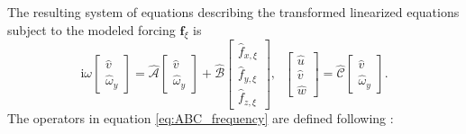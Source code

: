 The resulting system of equations describing the transformed linearized equations subject to the modeled forcing $\boldsymbol{f}_\xi$ is 
\begin{subequations}
\label{eq:ABC_frequency}
\begin{equation}
    \text{i}\omega\begin{bmatrix}
    \widehat{v}\\
    \widehat{\omega}_y
    \end{bmatrix}=\widehat{\mathcal{A}}\begin{bmatrix}
    \widehat{v}\\
    \widehat{\omega}_y
    \end{bmatrix}+\widehat{\mathcal{B}}\begin{bmatrix}\widehat{f}_{x,\xi}\\
    \widehat{f}_{y,\xi}\\
    \widehat{f}_{z,\xi}\end{bmatrix},\;\;
    \begin{bmatrix}\widehat{u}\\
    \widehat{v}\\
    \widehat{w}\end{bmatrix}=\widehat{\mathcal{C}}\begin{bmatrix}
    \widehat{v}\\
    \widehat{\omega}_y
    \end{bmatrix}.\tag{\theequation a,b}
\end{equation}
\end{subequations}
The operators in equation \eqref{eq:ABC_frequency} are defined following \citet{Jovanovic2005}:
\begingroup
\allowdisplaybreaks

